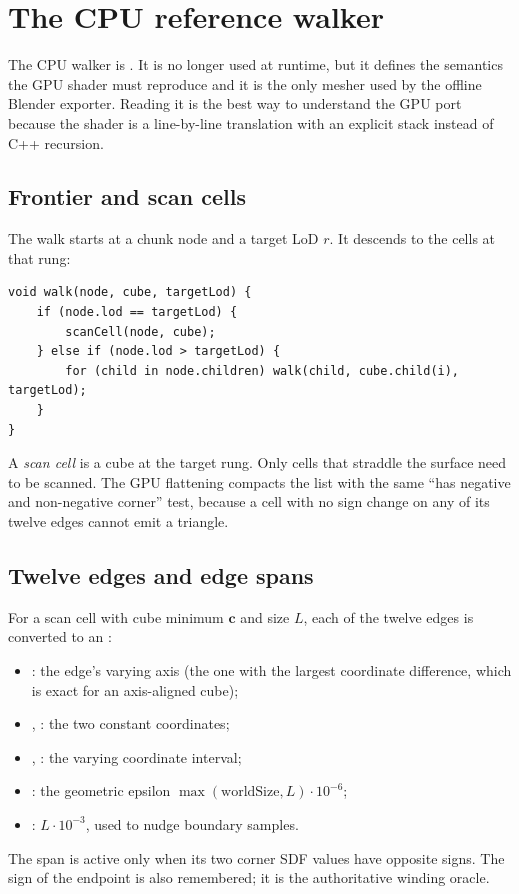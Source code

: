 \section{The CPU reference walker}
\label{sec:cpuwalk}

The CPU walker is .  It is
no longer used at runtime, but it defines the semantics the GPU shader must
reproduce and it is the only mesher used by the offline Blender exporter.
Reading it is the best way to understand the GPU port because the shader is
a line-by-line translation with an explicit stack instead of C++
recursion.

\subsection{Frontier and scan cells}

The walk starts at a chunk node and a target LoD $r$.  It descends to the
cells at that rung:
\begin{lstlisting}[caption={Frontier descent (conceptual).},label={lst:frontier}]
void walk(node, cube, targetLod) {
    if (node.lod == targetLod) {
        scanCell(node, cube);
    } else if (node.lod > targetLod) {
        for (child in node.children) walk(child, cube.child(i), targetLod);
    }
}
\end{lstlisting}
A \emph{scan cell} is a cube at the target rung.  Only cells that straddle
the surface need to be scanned.  The GPU flattening compacts the list with
the same ``has negative and non-negative corner'' test, because a cell with
no sign change on any of its twelve edges cannot emit a triangle.

\subsection{Twelve edges and edge spans}

For a scan cell with cube minimum $\mathbf{c}$ and size $L$, each of the
twelve edges is converted to an :
\begin{itemize}
\item {}: the edge's varying axis (the one with the largest
  coordinate difference, which is exact for an axis-aligned cube);
\item {}, : the two constant coordinates;
\item {}, : the varying coordinate interval;
\item {}: the geometric epsilon
  $\max(\text{worldSize}, L)\cdot 10^{-6}$;
\item {}: $L\cdot10^{-3}$, used to nudge boundary samples.
\end{itemize}
The span is active only when its two corner SDF values have opposite signs.
The sign of the endpoint is also remembered; it is the authoritative
winding oracle.

